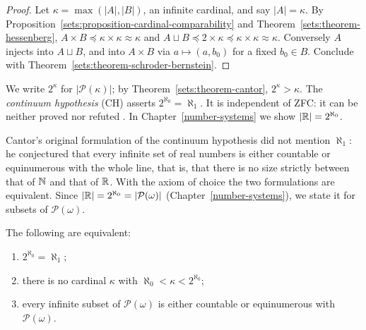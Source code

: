 \begin{proof}
Let $\kappa = \max(|A|, |B|)$, an infinite cardinal, and say $|A| = \kappa$. By
Proposition~\ref{sets:proposition-cardinal-comparability} and
Theorem~\ref{sets:theorem-hessenberg},
$A \times B \preceq \kappa \times \kappa \approx \kappa$ and
$A \sqcup B \preceq 2 \times \kappa \preceq \kappa \times \kappa \approx \kappa$.
Conversely $A$ injects into $A \sqcup B$, and into $A \times B$ via
$a \mapsto (a, b_0)$ for a fixed $b_0 \in B$. Conclude with
Theorem~\ref{sets:theorem-schroder-bernstein}.
\end{proof}

\begin{remark}\label{sets:remark-continuum-hypothesis}
We write $2^\kappa$ for $|\mathcal{P}(\kappa)|$; by
Theorem~\ref{sets:theorem-cantor}, $2^\kappa > \kappa$. The \emph{continuum
hypothesis} (CH) asserts $2^{\aleph_0} = \aleph_1$. It is independent of ZFC:
it can be neither proved \cite{cohen-1963} nor refuted \cite{godel-1938}.
In Chapter~\ref{number-systems} we show $|\mathbb{R}| = 2^{\aleph_0}$.
\end{remark}

Cantor's original formulation of the continuum hypothesis did not mention $\aleph_1$: he conjectured that every infinite set of real numbers is either countable or equinumerous with the whole line, that
is, that there is no size strictly between that of $\mathbb{N}$ and that of $\mathbb{R}$. With the axiom of choice the two formulations are equivalent. Since $|\mathbb{R}| = 2^{\aleph_0} = |\mathcal{P}(\omega)|$
(Chapter~\ref{number-systems}), we state it for subsets of $\mathcal{P}(\omega)$.

\begin{proposition}\label{sets:proposition-continuum-hypothesis}
The following are equivalent:
\begin{enumerate}
\item $2^{\aleph_0} = \aleph_1$;
\item there is no cardinal $\kappa$ with $\aleph_0 < \kappa < 2^{\aleph_0}$;
\item every infinite subset of $\mathcal{P}(\omega)$ is either countable or equinumerous with $\mathcal{P}(\omega)$.
\end{enumerate}
\end{proposition}

